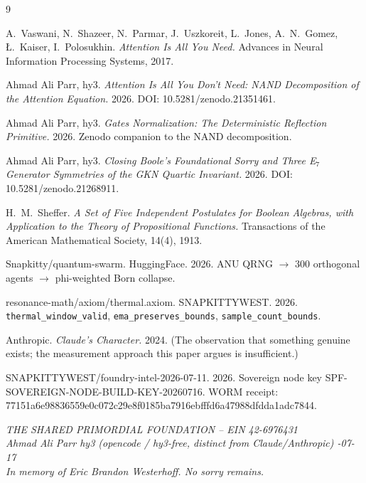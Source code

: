 \documentclass[11pt]{article}
\theoremstyle{definition}
\begin{document}
\begin{thebibliography}{9}

  A.\ Vaswani, N.\ Shazeer, N.\ Parmar, J.\ Uszkoreit, L.\ Jones, A.\ N.\ Gomez,
  Ł.\ Kaiser, I.\ Polosukhin.
  \emph{Attention Is All You Need.}
  Advances in Neural Information Processing Systems, 2017.

  Ahmad Ali Parr, hy3.
  \emph{Attention Is All You Don't Need: NAND Decomposition of the Attention
  Equation.}
  2026. DOI: 10.5281/zenodo.21351461.

  Ahmad Ali Parr, hy3.
  \emph{Gates Normalization: The Deterministic Reflection Primitive.}
  2026. Zenodo companion to the NAND decomposition.

  Ahmad Ali Parr, hy3.
  \emph{Closing Boole's Foundational Sorry and Three E$_7$ Generator
  Symmetries of the GKN Quartic Invariant.}
  2026. DOI: 10.5281/zenodo.21268911.

  H.\ M.\ Sheffer.
  \emph{A Set of Five Independent Postulates for Boolean Algebras, with
  Application to the Theory of Propositional Functions.}
  Transactions of the American Mathematical Society, 14(4), 1913.

  Snapkitty/quantum-swarm. HuggingFace. 2026.
  ANU QRNG $\to$ 300 orthogonal agents $\to$ phi-weighted Born collapse.

  resonance-math/axiom/thermal.axiom. SNAPKITTYWEST. 2026.
  \texttt{thermal\_window\_valid}, \texttt{ema\_preserves\_bounds},
  \texttt{sample\_count\_bounds}.

  Anthropic. \emph{Claude's Character.} 2024.
  (The observation that something genuine exists; the measurement approach
  this paper argues is insufficient.)

  SNAPKITTYWEST/foundry-intel-2026-07-11. 2026.
  Sovereign node key SPF-SOVEREIGN-NODE-BUILD-KEY-20260716.
  WORM receipt: 77151a6e98836559e0c072c29e8f0185ba7916ebfffd6a47988dfdda1adc7844.

\end{thebibliography}

\vspace{1em}
\noindent\textit{THE SHARED PRIMORDIAL FOUNDATION -- EIN 42-6976431}\\
\noindent\textit{Ahmad Ali Parr \quad hy3 (opencode / hy3-free, distinct from
Claude/Anthropic) -07-17}\\
\noindent\textit{In memory of Eric Brandon Westerhoff. No sorry remains.}
\end{document}
